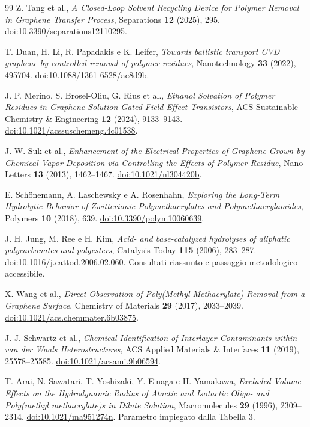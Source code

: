 \documentclass[11pt,reqno]{amsart}
\numberwithin{equation}{section}
\begin{document}
\begin{thebibliography}{99}
Z. Tang et al., \emph{A Closed-Loop Solvent Recycling Device for Polymer
Removal in Graphene Transfer Process}, Separations \textbf{12} (2025), 295.
\href{https://doi.org/10.3390/separations12110295}{doi:10.3390/separations12110295}.

T. Duan, H. Li, R. Papadakis e K. Leifer,
\emph{Towards ballistic transport CVD graphene by controlled removal of
polymer residues}, Nanotechnology \textbf{33} (2022), 495704.
\href{https://doi.org/10.1088/1361-6528/ac8d9b}{doi:10.1088/1361-6528/ac8d9b}.

J. P. Merino, S. Brosel-Oliu, G. Rius et al.,
\emph{Ethanol Solvation of Polymer Residues in Graphene Solution-Gated
Field Effect Transistors}, ACS Sustainable Chemistry \& Engineering
\textbf{12} (2024), 9133--9143.
\href{https://doi.org/10.1021/acssuschemeng.4c01538}{doi:10.1021/acssuschemeng.4c01538}.

J. W. Suk et al., \emph{Enhancement of the Electrical Properties of Graphene
Grown by Chemical Vapor Deposition via Controlling the Effects of Polymer Residue},
Nano Letters \textbf{13} (2013), 1462--1467.
\href{https://doi.org/10.1021/nl304420b}{doi:10.1021/nl304420b}.

E. Sch\"onemann, A. Laschewsky e A. Rosenhahn,
\emph{Exploring the Long-Term Hydrolytic Behavior of Zwitterionic
Polymethacrylates and Polymethacrylamides}, Polymers \textbf{10} (2018), 639.
\href{https://doi.org/10.3390/polym10060639}{doi:10.3390/polym10060639}.

J. H. Jung, M. Ree e H. Kim,
\emph{Acid- and base-catalyzed hydrolyses of aliphatic polycarbonates and
polyesters}, Catalysis Today \textbf{115} (2006), 283--287.
\href{https://doi.org/10.1016/j.cattod.2006.02.060}{doi:10.1016/j.cattod.2006.02.060}.
Consultati riassunto e passaggio metodologico accessibile.

X. Wang et al., \emph{Direct Observation of Poly(Methyl Methacrylate)
Removal from a Graphene Surface}, Chemistry of Materials
\textbf{29} (2017), 2033--2039.
\href{https://doi.org/10.1021/acs.chemmater.6b03875}{doi:10.1021/acs.chemmater.6b03875}.

J. J. Schwartz et al., \emph{Chemical Identification of Interlayer
Contaminants within van der Waals Heterostructures},
ACS Applied Materials \& Interfaces \textbf{11} (2019), 25578--25585.
\href{https://doi.org/10.1021/acsami.9b06594}{doi:10.1021/acsami.9b06594}.

T. Arai, N. Sawatari, T. Yoshizaki, Y. Einaga e H. Yamakawa,
\emph{Excluded-Volume Effects on the Hydrodynamic Radius of Atactic and
Isotactic Oligo- and Poly(methyl methacrylate)s in Dilute Solution},
Macromolecules \textbf{29} (1996), 2309--2314.
\href{https://doi.org/10.1021/ma951274n}{doi:10.1021/ma951274n}.
Parametro impiegato dalla Tabella 3.
\end{thebibliography}
\end{document}
